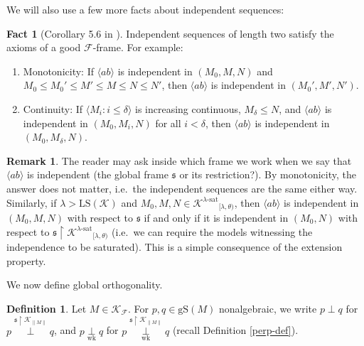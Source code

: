 \documentclass[12pt]{amsart}
\theoremstyle{definition}
\newtheorem{defin}[mydef]{Definition}
\newtheorem{remark}[mydef]{Remark}
\newtheorem{fact}[mydef]{Fact}
\begin{document}
We will also use a few more facts about independent sequences:

\begin{fact}[Corollary 5.6 in \cite{tame-frames-revisited-v4}]\label{indep-facts}
  Independent sequences of length two satisfy the axioms of a good ${\mathcal{F}}$-frame. For example:
  \begin{enumerate}
    \item Monotonicity: If ${\langle {ab} \rangle}$ is independent in $(M_0, M, N)$ and $M_0 {\le} M_0' {\le} M' {\le} M {\le} N {\le} N'$, then ${\langle {ab} \rangle}$ is independent in $(M_0', M', N')$.
    \item Continuity: If ${\langle {M_i : i \le \delta} \rangle}$ is increasing continuous, $M_\delta {\le} N$, and ${\langle {a b} \rangle}$ is independent in $(M_0, M_i, N)$ for all $i < \delta$, then ${\langle {ab} \rangle}$ is independent in $(M_0, M_\delta, N)$.
  \end{enumerate}
\end{fact}
\begin{remark}
  The reader may ask inside which frame we work when we say that ${\langle {ab} \rangle}$ is independent (the global frame ${\mathfrak{s}}$ or its restriction?). By monotonicity, the answer does not matter, i.e.\ the independent sequences are the same either way. Similarly, if $\lambda > {\text{LS}} ({\mathcal{K}})$ and $M_0, M, N \in {{{{\mathcal{K}}}^{{{\lambda}}\text{-sat}}}}_{[\lambda, \theta)}$, then ${\langle {ab} \rangle}$ is independent in $(M_0, M, N)$ with respect to ${\mathfrak{s}}$ if and only if it is independent in $(M_0, N)$ with respect to ${\mathfrak{s}} {\upharpoonright} {{{{\mathcal{K}}}^{{{\lambda}}\text{-sat}}}}_{[\lambda, \theta)}$ (i.e.\ we can require the models witnessing the independence to be saturated). This is a simple consequence of the extension property.
\end{remark}

We now define global orthogonality. 

\begin{defin}
  Let $M \in {\mathcal{K}}_{\mathcal{F}}$. For $p, q \in {\text{gS}} (M)$ nonalgebraic, we write $p \perp q$ for $p {{\underset{{{}}}{\overset{{{{\mathfrak{s}} {\upharpoonright} {\mathcal{K}}_{\|M\|}}}}{{\perp}}}}} q$, and $p {{{{\underset{{{\text{wk}}}}{\overset{{{{}}}}{{\perp}}}}}}} q$ for $p {{{\underset{{{\text{wk}}}}{\overset{{{{{\mathfrak{s}} {\upharpoonright} {\mathcal{K}}_{\|M\|}}}}}{{\perp}}}}}} q$ (recall Definition \ref{perp-def}).
\end{defin}
\end{document}
